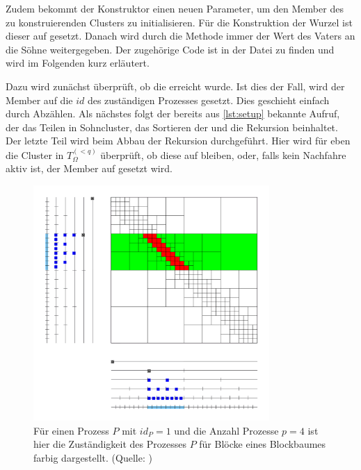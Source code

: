     Zudem bekommt der Konstruktor   einen neuen Parameter, um den Member  des zu konstruierenden Clusters zu initialisieren. Für die
    Konstruktion der Wurzel ist dieser auf  gesetzt. Danach wird durch die Methode  immer der Wert des Vaters an die Söhne weitergegeben.
    Der zugehörige Code ist in der Datei  zu finden und wird im Folgenden kurz erläutert.
    
    Dazu wird zunächst überprüft, ob die  erreicht wurde. Ist dies der Fall, wird der Member  auf 
    die $id$ des zuständigen Prozesses gesetzt. Dies geschieht einfach durch Abzählen. Als nächstes folgt der bereits aus \autoref{lst:setup} bekannte Aufruf, der das Teilen in Sohncluster, das 
    Sortieren der  und die Rekursion beinhaltet. Der letzte Teil wird beim Abbau der Rekursion durchgeführt. Hier wird für eben die Cluster in $T_\Omega^{(<q)}$ überprüft, ob diese 
    auf  bleiben, oder, falls kein Nachfahre aktiv ist, der Member  auf  gesetzt wird.
    
    \begin{figure}[b]
      \includegraphics[width=0.8\textwidth]{img/verteilter_blockbaum.png}
      \caption{Für einen Prozess $P$ mit $id_P = 1$ und die Anzahl Prozesse $p = 4$ ist hier die Zuständigkeit des Prozesses $P$ für Blöcke eines Blockbaumes farbig dargestellt.
	       (Quelle: \citet{h2slides})}
      \label{fig:vertblock}
    \end{figure}
    
